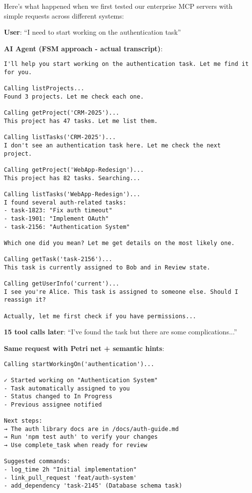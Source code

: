 \documentclass[11pt,a4paper]{article}
\begin{document}
Here's what happened when we first tested our enterprise MCP servers with simple requests across different systems:

\textbf{User}: ``I need to start working on the authentication task''

\textbf{AI Agent (FSM approach - actual transcript)}:

\begin{lstlisting}[language={}]
I'll help you start working on the authentication task. Let me find it for you.

Calling listProjects...
Found 3 projects. Let me check each one.

Calling getProject('CRM-2025')...
This project has 47 tasks. Let me list them.

Calling listTasks('CRM-2025')...
I don't see an authentication task here. Let me check the next project.

Calling getProject('WebApp-Redesign')...
This project has 82 tasks. Searching...

Calling listTasks('WebApp-Redesign')...
I found several auth-related tasks:
- task-1823: "Fix auth timeout"
- task-1901: "Implement OAuth"
- task-2156: "Authentication System"

Which one did you mean? Let me get details on the most likely one.

Calling getTask('task-2156')...
This task is currently assigned to Bob and in Review state. 

Calling getUserInfo('current')...
I see you're Alice. This task is assigned to someone else. Should I reassign it?

Actually, let me first check if you have permissions...
\end{lstlisting}

\textbf{15 tool calls later}: ``I've found the task but there are some complications...''

\hrulefill

\textbf{Same request with Petri net + semantic hints}:

\begin{lstlisting}[language={}]
Calling startWorkingOn('authentication')...

✓ Started working on "Authentication System"
- Task automatically assigned to you
- Status changed to In Progress
- Previous assignee notified

Next steps:
→ The auth library docs are in /docs/auth-guide.md
→ Run 'npm test auth' to verify your changes
→ Use complete_task when ready for review

Suggested commands:
- log_time 2h "Initial implementation"
- link_pull_request 'feat/auth-system'
- add_dependency 'task-2145' (Database schema task)
\end{lstlisting}
\end{document}
